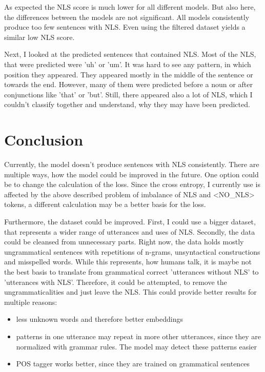\documentclass[
	11pt, %
]{fphw}
\begin{document}
As expected the NLS score is much lower for all different models. But also here, the differences between the models are not significant. All models consistently produce too few sentences with NLS. Even using the filtered dataset yields a similar low NLS score.

Next, I looked at the predicted sentences that contained NLS. Most of the NLS, that were predicted were 'uh' or 'um'. It was hard to see any pattern, in which position they appeared. They appeared mostly in the middle of the sentence or towards the end. However, many of them were predicted before a noun or after conjunctions like 'that' or 'but'. Still, there appeared also a lot of NLS, which I couldn't classify together and understand, why they may have been predicted.

\section*{Conclusion}
Currently, the model doesn't produce sentences with NLS consistently. There are multiple ways, how the model could be improved in the future. One option could be to change the calculation of the loss. Since the cross entropy, I currently use is affected by the above described problem of imbalance of NLS and <NO\_NLS> tokens, a different calculation may be a better basis for the loss.

Furthermore, the dataset could be improved. First, I could use a bigger dataset, that represents a wider range of utterances and uses of NLS. Secondly, the data could be cleansed from unnecessary parts. Right now, the data holds mostly ungrammatical sentences with repetitions of n-grams, unsyntactical constructions and misspelled words. While this represents, how humans talk, it is maybe not the best basis to translate from grammatical correct 'utterances without NLS' to 'utterances with NLS'. Therefore, it could be attempted, to remove the ungrammaticalities and just leave the NLS. This could provide better results for multiple reasons: 
\begin{itemize}
    \item less unknown words and therefore better embeddings
    \item patterns in one utterance may repeat in more other utterances, since they are normalized with grammar rules. The model may detect these patterns easier
    \item POS tagger works better, since they are trained on grammatical sentences 
\end{itemize}
\end{document}
